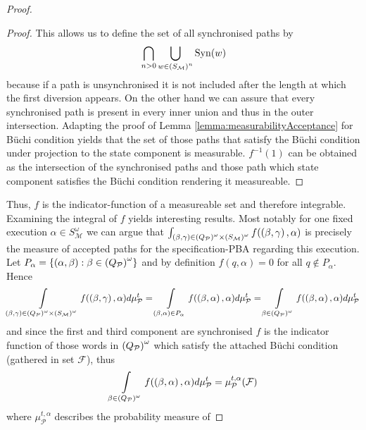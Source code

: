 \begin{proof}
\begin{proof}
  This allows us to define the set of all synchronised paths by
  \begin{equation*}
    \bigcap_{n>0}\bigcup_{w\in \left(S_{\mathcal{M}}\right)^{n}}\operatorname{Syn}(w)
  \end{equation*}
  because if a path is unsynchronised it is not included after the length at
  which the first diversion appears. On the other hand we can assure that every
  synchronised path is present in every inner union and thus in the outer
  intersection. Adapting the proof of Lemma \ref{lemma:measurabilityAcceptance}
  for Büchi condition yields that the set of those paths that satisfy the Büchi
  condition under projection to the state component is measurable. $f^{-1}(1)$
  can be obtained as the intersection of the synchronised paths and those
  path which state component satisfies the Büchi condition rendering it
  measureable.
\end{proof}
Thus, $f$ is the indicator-function of a measureable set and therefore
integrable. Examining the integral of $f$ yields interesting results. Most
notably for one fixed execution $\alpha\in S_{\mathcal{M}}^{\omega}$ we can
argue that $\int_{\left(\beta,\gamma\right)\in
\left(Q_{\mathcal{P}}\right)^{\omega}\times\left(S_{\mathcal{M}}\right)^{\omega}}
f(\left(\beta,\gamma\right),\alpha)$ is precisely the measure of accepted paths for
the specification-\ac{PBA} regarding this execution. Let
$P_{\alpha} = \left\{\left(\alpha, \beta\right):\beta\in
\left(Q_{\mathcal{P}}\right)^{\omega}\right\}$ and by definition $f(q, \alpha) = 0$ for all
$q\not\in P_{\alpha}$. Hence
\begin{equation*}
  \int\limits_{\left(\beta,\gamma\right)\in
  \left(Q_{\mathcal{P}}\right)^{\omega}\times\left(S_{\mathcal{M}}\right)^{\omega}}
  f(\left(\beta,\gamma\right),\alpha)d\mu_{\mathcal{P}}^{t}
  =\int\limits_{\left(\beta,\alpha\right)\in P_{\alpha}}
  f(\left(\beta,\alpha\right),\alpha)d\mu_{\mathcal{P}}^{t}
  =\int\limits_{\beta\in\left(Q_{\mathcal{P}}\right)^{\omega}}
  f(\left(\beta,\alpha\right),\alpha)d\mu_{\mathcal{P}}^{t}
\end{equation*}
and since the first and third component are synchronised $f$ is the indicator
function of those words in $\left(Q_{\mathcal{P}}\right)^{\omega}$ which satisfy the
attached Büchi condition (gathered in set $\mathcal{F}$), thus
\begin{equation*}
  \int\limits_{\beta\in\left(Q_{\mathcal{P}}\right)^{\omega}}
  f(\left(\beta,\alpha\right),\alpha)d\mu_{\mathcal{P}}^{t}
  = \mu_{\mathcal{P}}^{t,\alpha}(\mathcal{F})
\end{equation*}
where $\mu_{\mathcal{P}}^{t,\alpha}$ describes the probability measure of

\end{proof}
